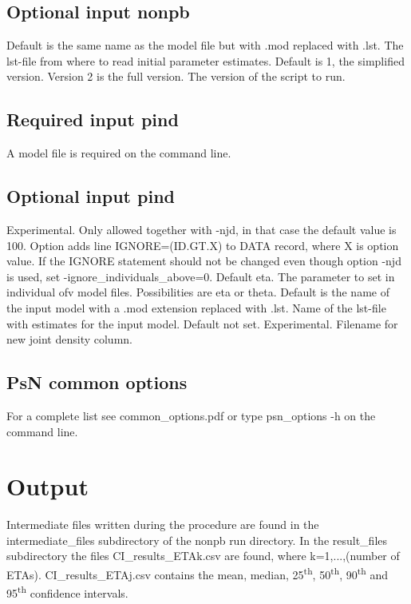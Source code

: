 \subsection{Optional input nonpb}
\begin{optionlist}
Default is the same name as the model file but with .mod replaced with .lst. The 
lst-file from where to read initial parameter estimates. 
\nextopt
{}
Default is 1, the simplified version. Version 2 is the full version. The version of 
the script to run.
\nextopt
\end{optionlist}

\subsection{Required input pind}
A model file is required on the command line.
\subsection{Optional input pind}
\begin{optionlist}
Experimental. Only allowed together with -njd, in that case the default value is 100. Option adds line IGNORE=(ID.GT.X) to DATA record, where X is option value. If the IGNORE statement should not be changed even though option -njd is used, set 
-ignore\_individuals\_above=0.
\nextopt
{}
Default eta. The parameter to set in individual ofv model files. Possibilities are eta or theta.
\nextopt
{}
Default is the name of the input model with a .mod extension replaced with .lst. Name of the lst-file with estimates for the input model. 
\nextopt
{}
Default not set. Experimental. Filename for new joint density column.
\nextopt
\end{optionlist}

\subsection{PsN common options}
For a complete list see common\_options.pdf or type psn\_options -h on the command line.

\section{Output}
Intermediate files written during the procedure are found in the intermediate\_files subdirectory of the nonpb run directory. In the result\_files subdirectory the files CI\_results\_ETAk.csv are found, where k=1,...,(number of ETAs). CI\_results\_ETAj.csv contains the mean, median, 25\textsuperscript{th}, 50\textsuperscript{th}, 90\textsuperscript{th} and 95\textsuperscript{th} confidence intervals.

